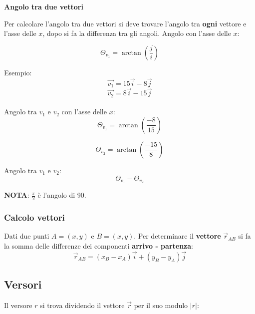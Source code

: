 \documentclass{article}
\begin{document}
\textbf{Angolo tra due vettori}

Per calcolare l'angolo tra due vettori si deve trovare l'angolo tra \textbf{ogni} vettore e l'asse delle $x$, dopo si fa la differenza tra gli angoli.
Angolo con l'asse delle $x$:

\begin{equation*}
  \Theta_{v_1}=\arctan(\frac{j}{i})
\end{equation*}

Esempio:
\begin{equation*}
  \overrightarrow{v_1} = 15\overrightarrow{i} - 8\overrightarrow{j}
\end{equation*}
\begin{equation*}
  \overrightarrow{v_2} = 8\overrightarrow{i} - 15\overrightarrow{j}
\end{equation*}\\
Angolo tra $v_1$ e $v_2$ con l'asse delle $x$:
\begin{equation*}
  \Theta_{v_1}=\arctan(\frac{-8}{15})
\end{equation*}

\begin{equation*}
  \Theta_{v_2}=\arctan(\frac{-15}{8})
\end{equation*}

Angolo tra $v_1$ e $v_2$: 
\begin{equation*}
  \Theta_{v_1}-\Theta_{v_2}
\end{equation*}

\textbf{NOTA}: $\frac{\pi}{2}$ è l'angolo di 90.

\subsubsection{Calcolo vettori}

Dati due punti $A=(x,y)$ e $B=(x,y)$. Per determinare il \textbf{vettore} $\overrightarrow{r}_{AB}$ si fa la somma delle differenze dei componenti \textbf{arrivo - partenza}:
\begin{equation*}
  \overrightarrow{r}_{AB} = (x_B-x_A)\overrightarrow{i} + (y_B-y_A)\overrightarrow{j}
\end{equation*}


\subsection*{Versori}

Il versore $r$ si trova dividendo il vettore $\overrightarrow{r}$ per il suo modulo $|r|$:
\end{document}
